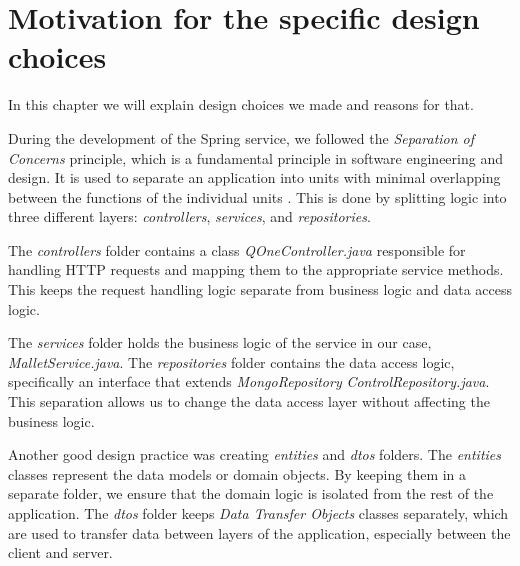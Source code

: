 \section{Motivation for the specific design choices}
\label{ch:motivation}

In this chapter we will explain design choices we made and reasons for that.

During the development of the Spring service, we followed the \textit{Separation of Concerns} principle, which is a
fundamental principle in software engineering and design. It is used to separate an application into units with
minimal overlapping between the functions of the individual units \cite{geeksforgeeks:soc}. This is done by splitting
logic into three different layers: \textit{controllers}, \textit{services}, and \textit{repositories}.

The \textit{controllers} folder contains a class \textit{QOneController.java} responsible for handling HTTP requests
and mapping them to the appropriate service methods. This keeps the request handling logic separate from business
logic and data access logic.

The \textit{services} folder holds the business logic of the service in our case, \textit{MalletService.java}. The
\textit{repositories} folder contains the data access logic, specifically an interface that extends
\textit{MongoRepository} \textit{ControlRepository.java}. This separation allows us to change the data access layer
without affecting the business logic.

Another good design practice was creating \textit{entities} and \textit{dtos} folders. The \textit{entities} classes
represent the data models or domain objects. By keeping them in a separate folder, we ensure that the domain logic
is isolated from the rest of the application. The \textit{dtos} folder keeps \textit{Data Transfer Objects} classes
separately, which are used to transfer data between layers of the application, especially between the client and server.

